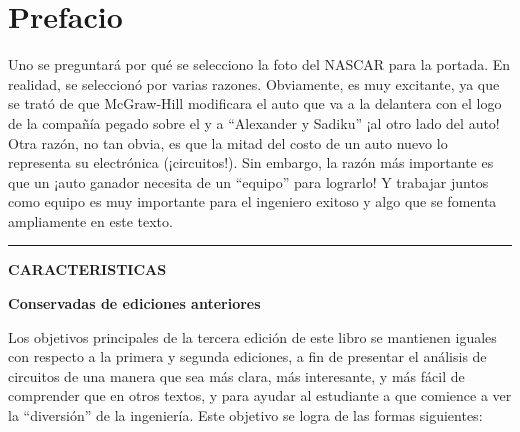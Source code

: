 	\chapter*{Prefacio}
		
		Uno se preguntará por qué se selecciono la foto del NASCAR para la portada. En realidad, se seleccionó por varias razones. Obviamente, es muy excitante, ya que se trató de que McGraw-Hill modificara el auto que va a la delantera con el logo de la compañía pegado sobre el y a “Alexander y Sadiku” ¡al otro lado del auto! Otra razón, no tan obvia, es que la mitad del costo de un auto nuevo lo representa su electrónica (¡circuitos!). Sin embargo, la razón más importante es que un ¡auto ganador necesita de un “equipo” para lograrlo! Y trabajar juntos como equipo es muy importante para el ingeniero exitoso y algo que se fomenta ampliamente en este texto.
		
\par\noindent\rule{\textwidth}{0.4pt}

\noindent
\textbf{\uppercase{Caracteristicas}}

\noindent
\textbf{Conservadas de ediciones anteriores}

Los objetivos principales de la tercera edición de este libro se mantienen iguales con respecto a la primera y segunda ediciones, a fin de presentar el análisis de circuitos de una manera que sea más clara, más interesante, y más fácil de comprender que en otros textos, y para ayudar al estudiante a que comience a ver la “diversión” de la ingeniería. Este objetivo se logra de las formas siguientes:

